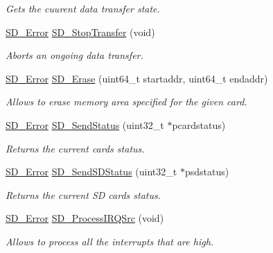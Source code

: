 \begin{DoxyCompactItemize}
\begin{DoxyCompactList}\small\item\em Gets the cuurent data transfer state. \end{DoxyCompactList}\item 
\hyperlink{group__sd__card_gacff91fa68daa1d1ee967b5b3fb3dbd8c}{S\+D\+\_\+\+Error} \hyperlink{group__sd__card_gad3dc52f076ae8145e105cb4d8a37b043}{S\+D\+\_\+\+Stop\+Transfer} (void)
\begin{DoxyCompactList}\small\item\em Aborts an ongoing data transfer. \end{DoxyCompactList}\item 
\hyperlink{group__sd__card_gacff91fa68daa1d1ee967b5b3fb3dbd8c}{S\+D\+\_\+\+Error} \hyperlink{group__sd__card_gaca2450c63f52cd6c1d50f6de33ecfdf8}{S\+D\+\_\+\+Erase} (uint64\+\_\+t startaddr, uint64\+\_\+t endaddr)
\begin{DoxyCompactList}\small\item\em Allows to erase memory area specified for the given card. \end{DoxyCompactList}\item 
\hyperlink{group__sd__card_gacff91fa68daa1d1ee967b5b3fb3dbd8c}{S\+D\+\_\+\+Error} \hyperlink{group__sd__card_ga7de24baeb4c6a7c9e5668630b8797888}{S\+D\+\_\+\+Send\+Status} (uint32\+\_\+t $\ast$pcardstatus)
\begin{DoxyCompactList}\small\item\em Returns the current card\textquotesingle{}s status. \end{DoxyCompactList}\item 
\hyperlink{group__sd__card_gacff91fa68daa1d1ee967b5b3fb3dbd8c}{S\+D\+\_\+\+Error} \hyperlink{group__sd__card_gab573516bdaa3054877172415e66d0e57}{S\+D\+\_\+\+Send\+S\+D\+Status} (uint32\+\_\+t $\ast$psdstatus)
\begin{DoxyCompactList}\small\item\em Returns the current SD card\textquotesingle{}s status. \end{DoxyCompactList}\item 
\hyperlink{group__sd__card_gacff91fa68daa1d1ee967b5b3fb3dbd8c}{S\+D\+\_\+\+Error} \hyperlink{group__sd__card_gab21b0412e865d8cabc915dc840fa1ccc}{S\+D\+\_\+\+Process\+I\+R\+Q\+Src} (void)
\begin{DoxyCompactList}\small\item\em Allows to process all the interrupts that are high. \end{DoxyCompactList}\item 

\end{DoxyCompactItemize}

